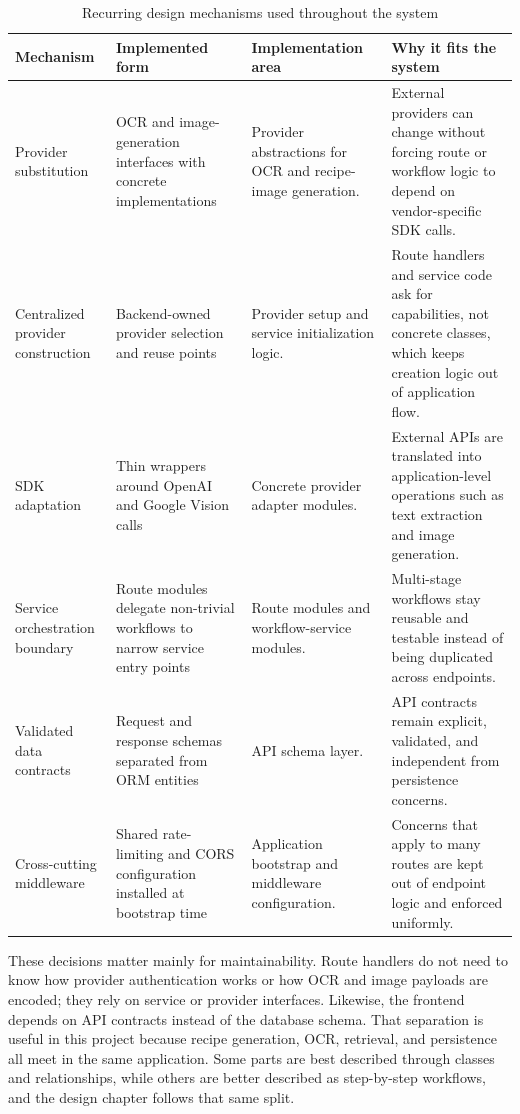 \begin{table}[H]
	\centering
	\scriptsize
	\renewcommand{\arraystretch}{1.2}
	\begin{tabularx}{\textwidth}{|p{2.5cm}|p{3.8cm}|p{3.8cm}|X|}
		\hline
		\textbf{Mechanism} & \textbf{Implemented form} & \textbf{Implementation area} & \textbf{Why it fits the system} \\
		\hline
		Provider substitution & OCR and image-generation interfaces with concrete implementations & Provider abstractions for OCR and recipe-image generation. & External providers can change without forcing route or workflow logic to depend on vendor-specific SDK calls. \\
		\hline
		Centralized provider construction & Backend-owned provider selection and reuse points & Provider setup and service initialization logic. & Route handlers and service code ask for capabilities, not concrete classes, which keeps creation logic out of application flow. \\
		\hline
		SDK adaptation & Thin wrappers around OpenAI and Google Vision calls & Concrete provider adapter modules. & External APIs are translated into application-level operations such as text extraction and image generation. \\
		\hline
		Service orchestration boundary & Route modules delegate non-trivial workflows to narrow service entry points & Route modules and workflow-service modules. & Multi-stage workflows stay reusable and testable instead of being duplicated across endpoints. \\
		\hline
		Validated data contracts & Request and response schemas separated from ORM entities & API schema layer. & API contracts remain explicit, validated, and independent from persistence concerns. \\
		\hline
		Cross-cutting middleware & Shared rate-limiting and CORS configuration installed at bootstrap time & Application bootstrap and middleware configuration. & Concerns that apply to many routes are kept out of endpoint logic and enforced uniformly. \\
		\hline
	\end{tabularx}
	\caption{Recurring design mechanisms used throughout the system}
	\label{tab:design-patterns}
\end{table}

These decisions matter mainly for maintainability. Route handlers do not
need to know how provider authentication works or how OCR and image
payloads are encoded; they rely on service or provider interfaces.
Likewise, the frontend depends on API contracts instead of the database
schema. That separation is useful in this project because recipe
generation, OCR, retrieval, and persistence all meet in the same
application. Some parts are best described through classes and
relationships, while others are better described as step-by-step
workflows, and the design chapter follows that same split.

